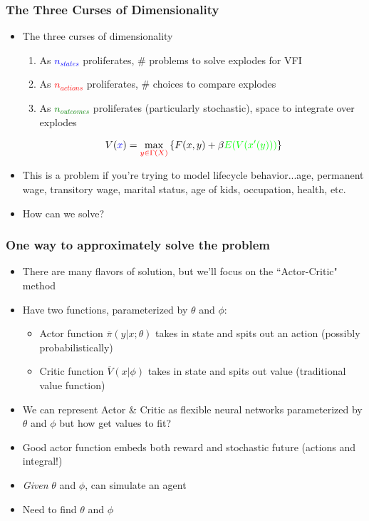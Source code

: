 \documentclass{beamer}
\begin{document}
\begin{frame}
\frametitle[alignment=center]{The Three Curses of Dimensionality}
\begin{itemize}
\item The three curses of dimensionality
\begin{enumerate}
\item As \textcolor{blue}{$n_{states}$} proliferates, \# problems to solve explodes for VFI
\item As \textcolor{red}{$n_{actions}$} proliferates, \# choices to compare explodes
\item As \textcolor{green}{$n_{outcomes}$} proliferates (particularly stochastic), space to integrate over explodes
\end{enumerate}
$$V(\textcolor{blue}{x})=\max_{\textcolor{red}{y\in\Gamma(X)}}\left\{F(x,y)+\beta \textcolor{green}{E(V(x'(y)))}\right\}$$
\item This is a problem if you're trying to model lifecycle behavior...age, permanent wage, transitory wage, marital status, age of kids, occupation, health, etc.
\bigskip
\item How can we solve?
\end{itemize}
\end{frame}


\begin{frame}
\frametitle[alignment=center]{One way to approximately solve the problem}
\begin{itemize}
\item There are many flavors of solution, but we'll focus on the ``Actor-Critic" method
\bigskip
\item Have two functions, parameterized by $\theta$ and $\phi$:
\begin{itemize}
\item Actor function $\overline{\pi}(y|x;\theta)$ takes in state and spits out an action (possibly probabilistically)
\bigskip
\item Critic function $\overline{V}(x|\phi)$  takes in state and spits out value (traditional value function)
\end{itemize}
\bigskip
\item We can represent Actor \& Critic as flexible neural networks parameterized by $\theta$ and $\phi$ but how get values to fit?
\bigskip
\item Good actor function embeds both reward and stochastic future (actions and integral!)
\bigskip
\item \emph{Given} $\theta$ and $\phi$, can simulate an agent
\bigskip
\item Need to find $\theta$ and $\phi$
\end{itemize}
\end{frame}
\end{document}
